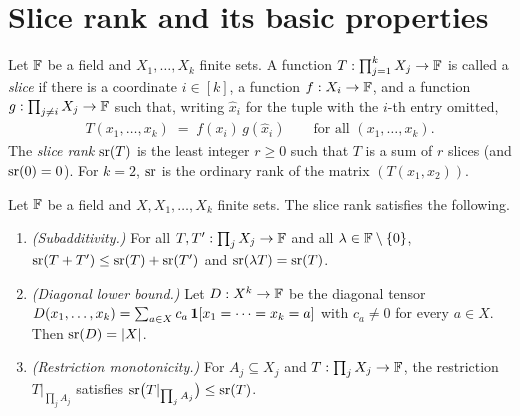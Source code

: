 \section{Slice rank and its basic properties}\label{sec:slice-rank}

Let $\mathbb{F}$ be a field and $X_1,\dots,X_k$ finite sets. A function
$T:\prod_{j=1}^k X_j\to\mathbb{F}$ is called a \emph{slice} if there is a coordinate
$i\in[k]$, a function $f:X_i\to\mathbb{F}$, and a function
$g:\prod_{j\ne i}X_j\to\mathbb{F}$ such that, writing $\widehat{x}_i$ for the tuple with the
$i$-th entry omitted,
\begin{align}\label{eq:slice}
T(x_1,\dots,x_k)\;=\;f(x_i)\,g(\widehat{x}_i)\qquad\text{for all }(x_1,\dots,x_k).
\end{align}
The \emph{slice rank} $\operatorname{sr}(T)$ is the least integer $r\ge 0$ such that $T$ is a sum
of $r$ slices (and $\operatorname{sr}(0)=0$). For $k=2$, $\operatorname{sr}$ is the ordinary rank of the matrix
$(T(x_1,x_2))$.

\begin{lemma}\label{lem:slice-rank-def}
Let $\mathbb{F}$ be a field and $X,X_1,\dots,X_k$ finite sets. The slice rank satisfies the
following.
\begin{enumerate}[label=\textup{(\alph*)}, ref=\ref*{lem:slice-rank-def}\alph*]
\item\label{lem:slice-rank-def:sub} \emph{(Subadditivity.)} For all
$T,T':\prod_j X_j\to\mathbb{F}$ and all $\lambda\in\mathbb{F}\setminus\{0\}$,
$\operatorname{sr}(T+T')\le\operatorname{sr}(T)+\operatorname{sr}(T')$ and $\operatorname{sr}(\lambda T)=\operatorname{sr}(T)$.
\item\label{lem:slice-rank-def:diag} \emph{(Diagonal lower bound.)} Let
$D:X^k\to\mathbb{F}$ be the diagonal tensor $D(x_1,\dots,x_k)=\sum_{a\in X}c_a\,
\mathbf{1}[x_1=\dots=x_k=a]$ with $c_a\ne 0$ for every $a\in X$. Then $\operatorname{sr}(D)=|X|$.
\item\label{lem:slice-rank-def:restrict} \emph{(Restriction monotonicity.)} For
$A_j\subseteq X_j$ and $T:\prod_j X_j\to\mathbb{F}$, the restriction $T|_{\prod_j A_j}$
satisfies $\operatorname{sr}\!\big(T|_{\prod_j A_j}\big)\le\operatorname{sr}(T)$.
\end{enumerate}
\end{lemma}

